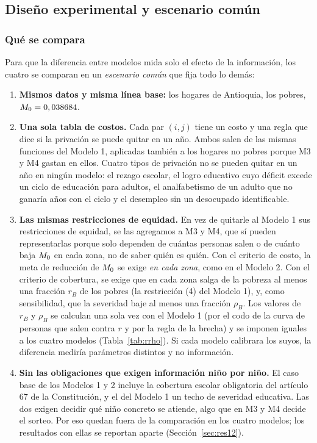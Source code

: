 \subsection{Diseño experimental y escenario común}\label{sec:diseno}

\subsubsection{Qué se compara}

Para que la diferencia entre modelos mida solo el efecto de la información, los
cuatro se comparan en un \emph{escenario común} que fija todo lo demás:
\begin{enumerate}
\item \textbf{Mismos datos y misma línea base:} los \cHogares{} hogares de
  Antioquia, los \cPobresHog{} pobres, $M_0=0,038684$.
\item \textbf{Una sola tabla de costos.} Cada par $(i,j)$ tiene un costo y una
  regla que dice si la privación se puede quitar en un año. Ambos salen de las
  mismas funciones del Modelo 1, aplicadas también a los hogares no pobres
  porque M3 y M4 gastan en ellos. Cuatro tipos de privación no se pueden quitar
  en un año en ningún modelo: el rezago escolar, el logro educativo cuyo déficit
  excede un ciclo de educación para adultos, el analfabetismo de un adulto que no
  ganaría años con el ciclo y el desempleo sin un desocupado identificable.
\item \textbf{Las mismas restricciones de equidad.} En vez de quitarle al Modelo 1
  sus restricciones de equidad, se las agregamos a M3 y M4, que sí pueden
  representarlas porque solo dependen de cuántas personas salen o de cuánto baja
  $M_0$ en cada zona, no de saber quién es quién. Con el criterio de costo, la
  meta de reducción de $M_0$ se exige \emph{en cada zona}, como en el Modelo 2.
  Con el criterio de cobertura, se exige que en cada zona salga de la pobreza
  al menos una fracción $r_B$ de los pobres (la restricción (4) del Modelo 1), y,
  como sensibilidad, que la severidad baje al menos una fracción $\rho_B$. Los
  valores de $r_B$ y $\rho_B$ se calculan una sola vez con el Modelo 1 (por el
  codo de la curva de personas que salen contra $r$ y por la regla de la brecha)
  y se imponen iguales a los cuatro modelos (Tabla~\ref{tab:rrho}). Si cada modelo
  calibrara los suyos, la diferencia mediría parámetros distintos y no
  información.
\item \textbf{Sin las obligaciones que exigen información niño por niño.} El caso
  base de los Modelos 1 y 2 incluye la cobertura escolar obligatoria del artículo
  67 de la Constitución, y el del Modelo 1 un techo de severidad educativa. Las
  dos exigen decidir qué niño concreto se atiende, algo que en M3 y M4 decide el
  sorteo. Por eso quedan fuera de la comparación en los cuatro modelos; los
  resultados con ellas se reportan aparte (Sección~\ref{sec:res12}).
\end{enumerate}

